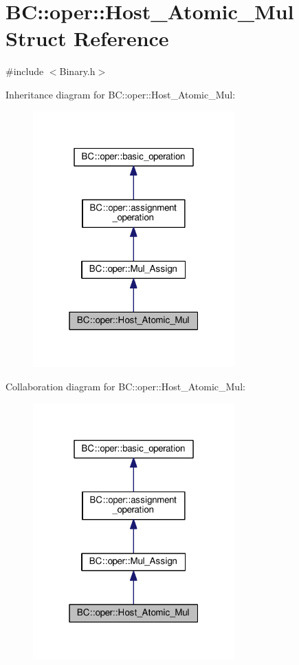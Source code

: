 \hypertarget{structBC_1_1oper_1_1Host__Atomic__Mul}{}\section{BC\+:\+:oper\+:\+:Host\+\_\+\+Atomic\+\_\+\+Mul Struct Reference}
\label{structBC_1_1oper_1_1Host__Atomic__Mul}


{\ttfamily \#include $<$Binary.\+h$>$}



Inheritance diagram for BC\+:\+:oper\+:\+:Host\+\_\+\+Atomic\+\_\+\+Mul\+:
\nopagebreak
\begin{figure}[H]
\begin{center}
\leavevmode
\includegraphics[width=220pt]{structBC_1_1oper_1_1Host__Atomic__Mul__inherit__graph}
\end{center}
\end{figure}


Collaboration diagram for BC\+:\+:oper\+:\+:Host\+\_\+\+Atomic\+\_\+\+Mul\+:
\nopagebreak
\begin{figure}[H]
\begin{center}
\leavevmode
\includegraphics[width=220pt]{structBC_1_1oper_1_1Host__Atomic__Mul__coll__graph}
\end{center}
\end{figure}
